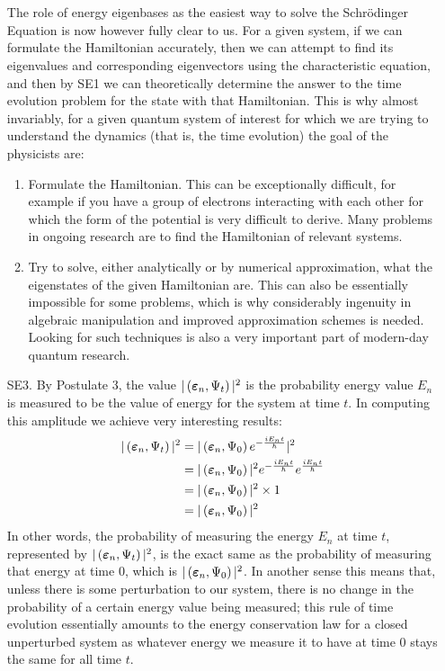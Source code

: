 \begin{enumerate}
    \\\\
    The role of energy eigenbases as the easiest way to solve the Schr\"{o}dinger Equation is now however fully clear to us. For a given system, if we can formulate the Hamiltonian accurately, then we can attempt to find its eigenvalues and corresponding eigenvectors using the characteristic equation, and then by SE1 we can theoretically determine the answer to the time evolution problem for the state with that Hamiltonian. This is why almost invariably, for a given quantum system of interest for which we are trying to understand the dynamics (that is, the time evolution) the goal of the physicists are:
    \begin{enumerate}
        \item Formulate the Hamiltonian. This can be exceptionally difficult, for example if you have a group of electrons interacting with each other for which the form of the potential is very difficult to derive. Many problems in ongoing research are to find the Hamiltonian of relevant systems.
        \item Try to solve, either analytically or by numerical approximation, what the eigenstates of the given Hamiltonian are. This can also be essentially impossible for some problems, which is why considerably ingenuity in algebraic manipulation and improved approximation schemes is needed. Looking for such techniques is also a very important part of modern-day quantum research.
    \end{enumerate}
    \item[SE3.] By Postulate 3, the value $|\left(\bm{\varepsilon}_{n},\Psi_{t}\right)|^2$ is the probability energy value $E_{n}$ is measured to be the value of energy for the system at time $t$. In computing this amplitude we achieve very interesting results:
    $$
    \begin{aligned}
    |\left(\bm{\varepsilon}_{n},\Psi_{t}\right)|^2 &=  |\left(\bm{\varepsilon}_{n},\Psi_{0}\right)e^{-\frac{iE_{n}t}{\hbar}}|^2\\
    &=|\left(\bm{\varepsilon}_{n},\Psi_{0}\right)|^2e^{-\frac{iE_{n}t}{\hbar}}e^{\frac{iE_{n}t}{\hbar}}\\
    &=|\left(\bm{\varepsilon}_{n},\Psi_{0}\right)|^2\times 1\\
    &=|\left(\bm{\varepsilon}_{n},\Psi_{0}\right)|^2
    \end{aligned}
    $$
    In other words, the probability of measuring the energy $E_{n}$ at time $t$, represented by $|\left(\bm{\varepsilon}_{n},\Psi_{t}\right)|^2$, is the exact same as the probability of measuring that energy at time 0, which is $|\left(\bm{\varepsilon}_{n},\Psi_{0}\right)|^2$. In another sense this means that, unless there is some perturbation to our system, there is no change in the probability of a certain energy value being measured; this rule of time evolution essentially amounts to the energy conservation law for a closed unperturbed system as whatever energy we measure it to have at time 0 stays the same for all time $t$.

\end{enumerate}
